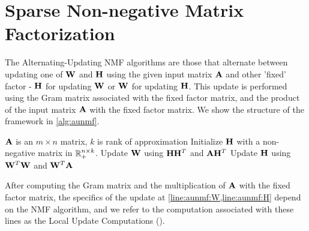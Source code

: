 \section{Sparse Non-negative Matrix Factorization}
\label{sec:sparsenmf}

The Alternating-Updating NMF algorithms are those that alternate between updating one of $\WW$ and $\HH$ using the given input matrix $\AA$ and other 'fixed' factor - $\HH$ for updating $\WW$ or $\WW$ for updating $\HH$.
This update is performed using the Gram matrix associated with the fixed factor matrix, and the product of the input matrix $\AA$ with the fixed factor matrix.
We show the structure of the framework in \cref{alg:aunmf}. 


\begin{algorithm}
\caption{$[\WW,\HH] = \text{AU-NMF}(A,k)$}
\label{alg:aunmf}
\begin{algorithmic}[1]
\REQUIRE $\AA$ is an $m\times n$ matrix, $k$ is rank of approximation
\STATE Initialize $\HH$ with a non-negative matrix in $\Rn{n\times k}_+$.
 \label{algo:nmfloop}
  \STATE Update $\WW$ using $\HH \HH^T$ and $\AA \HH^T$ \label{line:aunmf-w}
  \label{line:aunmf:W}
  \STATE Update $\HH$ using $\WW^T\WW$ and $\WW^T \AA$ \label{line:aunmf-h}
  \label{line:aunmf:H}
\ENDWHILE
\end{algorithmic}
\end{algorithm}

After computing the Gram matrix and the multiplication of $\AA$ with the fixed factor matrix, the specifics of the update at \cref{line:aunmf:W,line:aunmf:H} depend on the NMF algorithm, and we refer to the computation associated with these lines as the Local Update Computations (\LUC).

